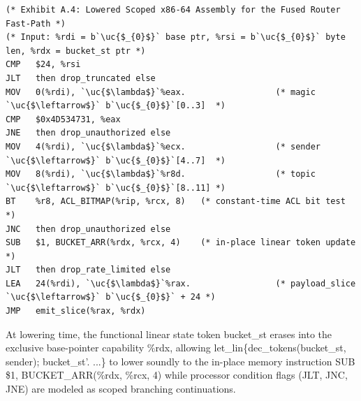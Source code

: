 \begin{lstlisting}[basicstyle=\ttfamily\footnotesize]
(* Exhibit A.4: Lowered Scoped x86-64 Assembly for the Fused Router Fast-Path *)
(* Input: %rdi = b`\uc{$_{0}$}` base ptr, %rsi = b`\uc{$_{0}$}` byte len, %rdx = bucket_st ptr *)
CMP   $24, %rsi
JLT   then drop_truncated else
MOV   0(%rdi), `\uc{$\lambda$}`%eax.                  (* magic  `\uc{$\leftarrow$}` b`\uc{$_{0}$}`[0..3]  *)
CMP   $0x4D534731, %eax
JNE   then drop_unauthorized else
MOV   4(%rdi), `\uc{$\lambda$}`%ecx.                  (* sender `\uc{$\leftarrow$}` b`\uc{$_{0}$}`[4..7]  *)
MOV   8(%rdi), `\uc{$\lambda$}`%r8d.                  (* topic  `\uc{$\leftarrow$}` b`\uc{$_{0}$}`[8..11] *)
BT    %r8, ACL_BITMAP(%rip, %rcx, 8)   (* constant-time ACL bit test *)
JNC   then drop_unauthorized else
SUB   $1, BUCKET_ARR(%rdx, %rcx, 4)    (* in-place linear token update *)
JLT   then drop_rate_limited else
LEA   24(%rdi), `\uc{$\lambda$}`%rax.                 (* payload_slice `\uc{$\leftarrow$}` b`\uc{$_{0}$}` + 24 *)
JMP   emit_slice(%rax, %rdx)
\end{lstlisting}
At lowering time, the functional linear state token bucket\_st erases into the exclusive base-pointer capability \%rdx, allowing let\_lin\{dec\_tokens(bucket\_st, sender); bucket\_st'. ...\} to lower soundly to the in-place memory instruction SUB \$1, BUCKET\_ARR(\%rdx, \%rcx, 4) while processor condition flags (JLT, JNC, JNE) are modeled as scoped branching continuations.


